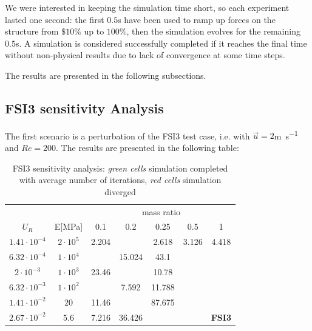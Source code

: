 We were interested in keeping the simulation time short, so each experiment lasted one second: the first $0.5$\si{s} have been used to ramp up forces on the structure from $\$10\%$ up to $100\%$, then the simulation evolves for the remaining $0.5$\si{s}. A simulation is considered successfully completed if it reaches the final time without non-physical results due to lack of convergence at some time steps.

The results are presented in the following subsections.


\subsection{FSI3 sensitivity Analysis}

The first scenario is a perturbation of the FSI3 test case, i.e. with $\vec{u}=2$\si{m.s^{-1}} and $Re=200$. The results are presented in the following table:

% 
\begin{table}[!htb]
	\begin{center}
		\begin{tabular}{ c | c | c c c c c |} 
			&  & \multicolumn{5}{c}{mass ratio} \\
			
			$U_R$ & E[\si{MPa}] & 0.1 & 0.2 & 0.25 & 0.5 & 1 \\
			\hline
			
			$1.41\cdot 10^{-4}$ & $2\cdot 10^{5}$ & \cellcolor{green!10}2.204 & \cellcolor{green!10} & \cellcolor{green!10}2.618 & \cellcolor{green!10}3.126 & \cellcolor{green!10}4.418 \\
			$6.32\cdot 10^{-4}$ & $1\cdot 10^{4}$ & \cellcolor{green!10} & \cellcolor{green!10}15.024 & \cellcolor{green!10}43.1 & \cellcolor{red!10} & \cellcolor{red!10} \\        
			$2\cdot 10^{-3}$ & $1\cdot 10^{3}$ & \cellcolor{green!10}23.46 & \cellcolor{green!10} & \cellcolor{green!10}10.78 & \cellcolor{red!10} & \cellcolor{red!10} \\
			$6.32\cdot 10^{-3}$ & $1\cdot 10^{2}$ & \cellcolor{green!10} & \cellcolor{green!10}7.592 & \cellcolor{green!10}11.788 & \cellcolor{red!10} & \cellcolor{red!10} \\
			$1.41\cdot 10^{-2}$ & $20$ & \cellcolor{green!10}11.46 & \cellcolor{green!10} & \cellcolor{green!10}87.675 & \cellcolor{red!10} & \cellcolor{red!10} \\
			$2.67\cdot 10^{-2}$ & $5.6$ & \cellcolor{green!10}7.216 & \cellcolor{green!10}36.426 & \cellcolor{red!10} & \cellcolor{red!10} & \cellcolor{red!10}\textbf{FSI3} \\
			\hline                        
		\end{tabular}
	\end{center}
	\caption{FSI3 sensitivity analysis: \textit{green cells} simulation completed with average number of iterations, \textit{red cells} simulation diverged}
	\label{table:FSI3-sens}
\end{table}


